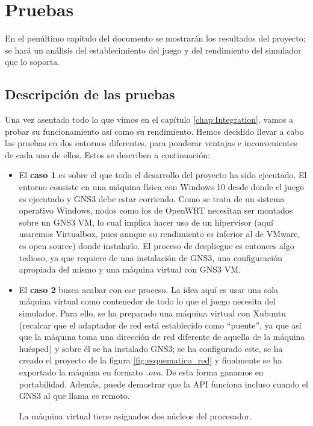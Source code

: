 \chapter{Pruebas}\label{chap:Pruebas}
En el penúltimo capítulo del documento se mostrarán los resultados del proyecto; se hará un análisis del establecimiento del juego y del rendimiento del simulador que lo soporta.

\section{Descripción de las pruebas}
Una vez asentado todo lo que vimos en el capítulo \ref{chap:Integration}, vamos a probar su funcionamiento así como su rendimiento. Hemos decidido llevar a cabo las pruebas en dos entornos diferentes, para ponderar ventajas e inconvenientes de cada uno de ellos. Estos se describen a continuación:
\begin{itemize}
\item El \textbf{caso 1} es sobre el que todo el desarrollo del proyecto ha sido ejecutado. El entorno consiste en una máquina física con Windows 10 desde donde el juego es ejecutado y GNS3 debe estar corriendo. Como se trata de un sistema operativo Windows, nodos como los de OpenWRT necesitan ser montados sobre un GNS3 VM, lo cual implica hacer uso de un hipervisor (aquí usaremos Virtualbox, pues aunque su rendimiento es inferior al de VMware, es open source) donde instalarlo. El proceso de despliegue es entonces algo tedioso, ya que requiere de una instalación de GNS3, una configuración apropiada del mismo y una máquina virtual con GNS3 VM.
\item El \textbf{caso 2} busca acabar con ese proceso. La idea aquí es usar una sola máquina virtual como contenedor de todo lo que el juego necesita del simulador. Para ello, se ha preparado una máquina virtual con Xubuntu (recalcar que el adaptador de red está establecido como ``puente'', ya que así que la máquina toma una dirección de red diferente de aquella de la máquina huésped) y sobre él se ha instalado GNS3; se ha configurado este, se ha creado el proyecto de la figura \ref{fig:esquematico_red} y finalmente se ha exportado la máquina en formato \textit{.ova}. De esta forma ganamos en portabilidad. Además, puede demostrar que la API funciona incluso cuando el GNS3 al que llama es remoto.

La máquina virtual tiene asignados dos núcleos del procesador.
\end{itemize}


